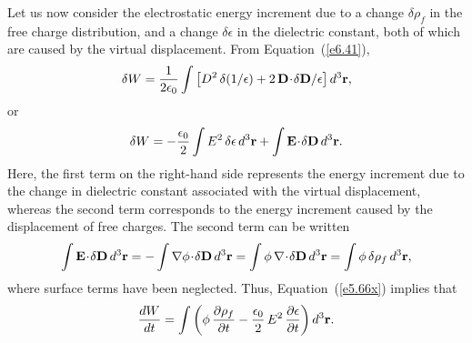 Let us now consider the electrostatic energy increment due to  a change $\delta\rho_f$
in the free charge distribution, and a change $\delta\epsilon$ in the
dielectric constant,  both of which are caused by the virtual displacement. From Equation~(\ref{e6.41}),
\begin{equation}
\delta W = \frac{1}{2\epsilon_0}\int \left[D^2\,\delta(1/\epsilon)
+ 2 \,{\bf D}\!\cdot\!\delta {\bf D}/\epsilon\right]d^3{\bf r},
\end{equation}
or 
\begin{equation}\label{e5.66x}
\delta W  = -\frac{\epsilon_0}{2}\int E^2\,\delta\epsilon \,
d^3{\bf r} + \int {\bf E} \!\cdot\!\delta{\bf D}\,d^3{\bf r}.
\end{equation}
Here, the first term on the right-hand side represents the energy increment due to the change
in dielectric constant associated with the virtual displacement, whereas
the second term corresponds to the energy increment caused by the displacement
of  free charges. The second term can be written
\begin{equation}
\int{\bf E}\!\cdot\! \delta{\bf D}\,d^3{\bf r} = -
\int\nabla\phi \!\cdot\! \delta {\bf D}\, d^3{\bf r} =\int \phi\,
\nabla\!\cdot\!\delta {\bf D}\,d^3{\bf r} = \int \phi\,\delta\rho_f\,d^3{\bf r},
\end{equation}
where surface terms have been neglected. Thus, Equation~(\ref{e5.66x}) implies
that
\begin{equation}\label{e5.68x}
\frac{dW}{dt} = \int\left(\phi\,\frac{\partial\rho_f}{\partial t} - \frac{\epsilon_0}{2} \,E^2\, \frac{\partial\epsilon}{\partial t}\right)d^3{\bf r}.
\end{equation}

